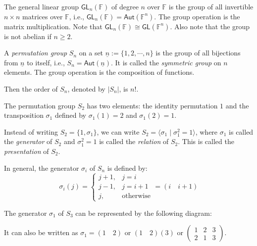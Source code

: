 \documentclass[
	11pt, %
	fleqn, %
	a4paper, %
]{LegrandOrangeBook}
\newcommand{\F}{\mathbb{F}} %
\newcommand{\GL}{\mathsf{GL}} %
\newcommand{\Aut}{\mathsf{Aut}} %
\begin{document}
\begin{example}
    The general linear group $\GL_n(\F)$ of degree $n$ over $\F$ is the group of all invertible $n \times n$ matrices over $\F$, i.e., $\GL_n(\F) = \Aut(\F^n)$. The group operation is the matrix multiplication. Note that $\GL_n(\F) \cong \GL(\F^n)$. Also note that the group is not abelian if $n \geq 2$.
\end{example}

\begin{definition}
    A \emph{permutation group} $S_n$ on a set $\underline{n} := \{ 1, 2, \cdots, n \}$ is the group of all bijections from $\underline{n}$ to itself, i.e., $S_n = \Aut(\underline{n})$. It is called the \emph{symmetric group} on $n$ elements. The group operation is the composition of functions.
\end{definition}

Then the order of $S_n$, denoted by $|S_n|$, is $n!$.

\begin{example}
    The permutation group $S_2$ has two elements: the identity permutation $1$ and the transposition $\sigma_1$ defined by $\sigma_1(1) = 2$ and $\sigma_1(2) = 1$. 
\end{example}

Instead of writing $S_2 = \{ 1, \sigma_1 \}$, we can write $S_2 = \langle \sigma_1 \mid \sigma_1^2 = 1 \rangle$, where $\sigma_1$ is called the \emph{generator} of $S_2$ and $\sigma_1^2 = 1$ is called the \emph{relation} of $S_2$. This is called the \emph{presentation} of $S_2$.

In general, the generator $\sigma_i$ of $S_n$ is defined by:
\[
    \sigma_i(j) = \begin{cases}
        j + 1, & j = i \\
        j - 1, & j = i + 1 \\
        j, & \text{otherwise}
    \end{cases} = (i \quad i + 1)
\]

\begin{example}
    The generator $\sigma_1$ of $S_3$ can be represented by the following diagram:
    \begin{center}
    \end{center}
    It can also be written as $\sigma_1 = (1 \quad 2)$ or $(1 \quad 2)(3)$ or $\begin{pmatrix}
        1 & 2 & 3 \\
        2 & 1 & 3
    \end{pmatrix}$.
\end{example}
\end{document}
